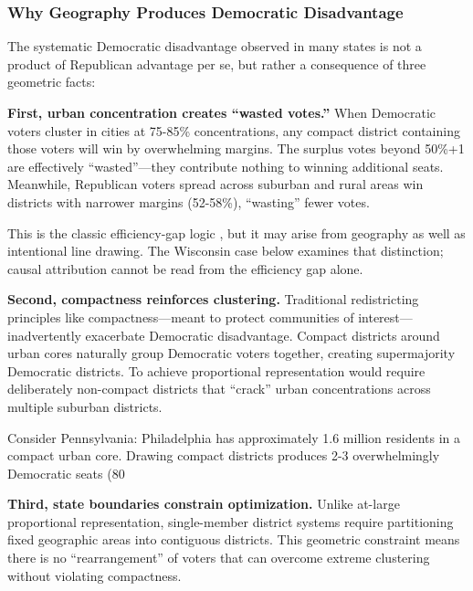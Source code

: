 \subsubsection{Why Geography Produces Democratic Disadvantage}

The systematic Democratic disadvantage observed in many states is not a product of Republican advantage per se, but rather a consequence of three geometric facts:

\textbf{First, urban concentration creates ``wasted votes.''} When Democratic voters cluster in cities at 75-85\% concentrations, any compact district containing those voters will win by overwhelming margins. The surplus votes beyond 50\%+1 are effectively ``wasted''---they contribute nothing to winning additional seats. Meanwhile, Republican voters spread across suburban and rural areas win districts with narrower margins (52-58\%), ``wasting'' fewer votes.

This is the classic efficiency-gap logic \citep{stephanopoulos2015partisan}, but it may arise from geography as well as intentional line drawing. The Wisconsin case below examines that distinction; causal attribution cannot be read from the efficiency gap alone.

\textbf{Second, compactness reinforces clustering.} Traditional redistricting principles like compactness---meant to protect communities of interest---inadvertently exacerbate Democratic disadvantage. Compact districts around urban cores naturally group Democratic voters together, creating supermajority Democratic districts. To achieve proportional representation would require deliberately non-compact districts that ``crack'' urban concentrations across multiple suburban districts.

Consider Pennsylvania: Philadelphia has approximately 1.6 million residents in a compact urban core. Drawing compact districts produces 2-3 overwhelmingly Democratic seats (80%

\textbf{Third, state boundaries constrain optimization.} Unlike at-large proportional representation, single-member district systems require partitioning fixed geographic areas into contiguous districts. This geometric constraint means there is no ``rearrangement'' of voters that can overcome extreme clustering without violating compactness.

